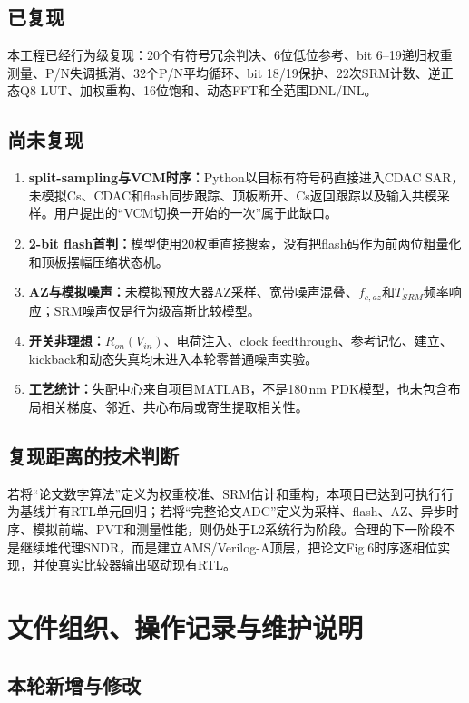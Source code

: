 \documentclass[11pt,a4paper,UTF8,fontset=none,openany]{ctexrep}
\numberwithin{equation}{chapter}
\numberwithin{figure}{chapter}
\numberwithin{table}{chapter}
\begin{document}
\section{已复现}

本工程已经行为级复现：20个有符号冗余判决、6位低位参考、bit 6--19递归权重测量、P/N失调抵消、32个P/N平均循环、bit 18/19保护、22次SRM计数、逆正态Q8 LUT、加权重构、16位饱和、动态FFT和全范围DNL/INL。

\section{尚未复现}

\begin{enumerate}
  \item \textbf{split-sampling与VCM时序：}Python以目标有符号码直接进入CDAC SAR，未模拟Cs、CDAC和flash同步跟踪、顶板断开、Cs返回跟踪以及输入共模采样。用户提出的“VCM切换一开始的一次”属于此缺口。
  \item \textbf{2-bit flash首判：}模型使用20权重直接搜索，没有把flash码作为前两位粗量化和顶板摆幅压缩状态机。
  \item \textbf{AZ与模拟噪声：}未模拟预放大器AZ采样、宽带噪声混叠、$f_{c,az}$和$T_{SRM}$频率响应；SRM噪声仅是行为级高斯比较模型。
  \item \textbf{开关非理想：}$R_{on}(V_{in})$、电荷注入、clock feedthrough、参考记忆、建立、kickback和动态失真均未进入本轮零普通噪声实验。
  \item \textbf{工艺统计：}失配中心来自项目MATLAB，不是180\,nm PDK模型，也未包含布局相关梯度、邻近、共心布局或寄生提取相关性。
\end{enumerate}

\section{复现距离的技术判断}

若将“论文数字算法”定义为权重校准、SRM估计和重构，本项目已达到可执行行为基线并有RTL单元回归；若将“完整论文ADC”定义为采样、flash、AZ、异步时序、模拟前端、PVT和测量性能，则仍处于L2系统行为阶段。合理的下一阶段不是继续堆代理SNDR，而是建立AMS/Verilog-A顶层，把论文Fig.6时序逐相位实现，并使真实比较器输出驱动现有RTL。

\chapter{文件组织、操作记录与维护说明}

\section{本轮新增与修改}
\end{document}
